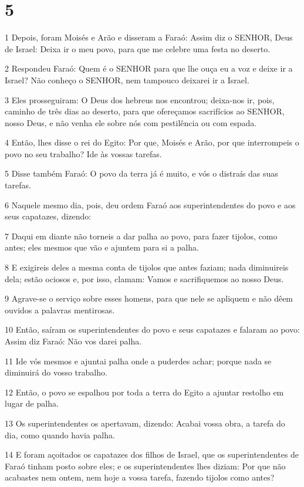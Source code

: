 \chapter{5}

\par 1 Depois, foram Moisés e Arão e disseram a Faraó: Assim diz o SENHOR, Deus de Israel: Deixa ir o meu povo, para que me celebre uma festa no deserto.
\par 2 Respondeu Faraó: Quem é o SENHOR para que lhe ouça eu a voz e deixe ir a Israel? Não conheço o SENHOR, nem tampouco deixarei ir a Israel.
\par 3 Eles prosseguiram: O Deus dos hebreus nos encontrou; deixa-nos ir, pois, caminho de três dias ao deserto, para que ofereçamos sacrifícios ao SENHOR, nosso Deus, e não venha ele sobre nós com pestilência ou com espada.
\par 4 Então, lhes disse o rei do Egito: Por que, Moisés e Arão, por que interrompeis o povo no seu trabalho? Ide às vossas tarefas.
\par 5 Disse também Faraó: O povo da terra já é muito, e vós o distraís das suas tarefas.
\par 6 Naquele mesmo dia, pois, deu ordem Faraó aos superintendentes do povo e aos seus capatazes, dizendo:
\par 7 Daqui em diante não torneis a dar palha ao povo, para fazer tijolos, como antes; eles mesmos que vão e ajuntem para si a palha.
\par 8 E exigireis deles a mesma conta de tijolos que antes faziam; nada diminuireis dela; estão ociosos e, por isso, clamam: Vamos e sacrifiquemos ao nosso Deus.
\par 9 Agrave-se o serviço sobre esses homens, para que nele se apliquem e não dêem ouvidos a palavras mentirosas.
\par 10 Então, saíram os superintendentes do povo e seus capatazes e falaram ao povo: Assim diz Faraó: Não vos darei palha.
\par 11 Ide vós mesmos e ajuntai palha onde a puderdes achar; porque nada se diminuirá do vosso trabalho.
\par 12 Então, o povo se espalhou por toda a terra do Egito a ajuntar restolho em lugar de palha.
\par 13 Os superintendentes os apertavam, dizendo: Acabai vossa obra, a tarefa do dia, como quando havia palha.
\par 14 E foram açoitados os capatazes dos filhos de Israel, que os superintendentes de Faraó tinham posto sobre eles; e os superintendentes lhes diziam: Por que não acabastes nem ontem, nem hoje a vossa tarefa, fazendo tijolos como antes?
